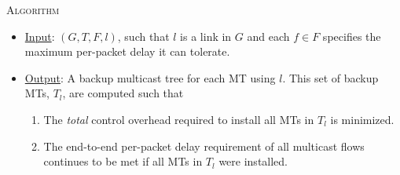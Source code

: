 \mc \textsc{Algorithm}
\begin{itemize}

	\item  \underline{Input}: $(G,T,F,l)$, such that $l$ is a link in $G$ and each $f \in F$ specifies the maximum per-packet delay it can tolerate.

	\item \underline{Output}: A backup multicast tree for each MT using $l$. This set of backup MTs, $T_l$, are computed such that 
	
	\begin{enumerate}
			
		\item The \emph{total} control overhead required to install all MTs in $T_l$ is minimized.
			
			\item The end-to-end per-packet delay requirement of all multicast flows continues to be met if all MTs in $T_l$ were installed. 
		\end{enumerate}

\end{itemize}

%




